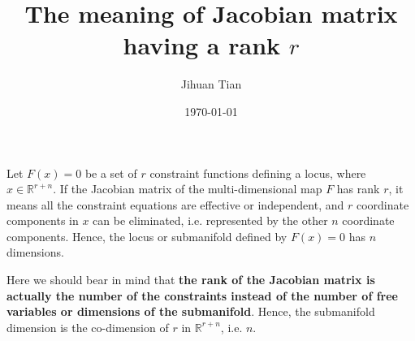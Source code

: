 \documentclass[11pt]{article}
\author{Jihuan Tian}
\date{\today}
\title{The meaning of Jacobian matrix having a rank \(r\)}
\begin{document}
\maketitle
\setcounter{tocdepth}{5}
\tableofcontents

Let \(F(x) = 0\) be a set of \(r\) constraint functions defining a locus, where \(x\in \mathbb{R}^{r+n}\). If the Jacobian matrix of the multi-dimensional map \(F\) has rank \(r\), it means all the constraint equations are effective or independent, and \(r\) coordinate components in \(x\) can be eliminated, i.e. represented by the other \(n\) coordinate components. Hence, the locus or submanifold defined by \(F(x) = 0\) has \(n\) dimensions.

Here we should bear in mind that \textbf{the rank of the Jacobian matrix is actually the number of the constraints instead of the number of free variables or dimensions of the submanifold}. Hence, the submanifold dimension is the co-dimension of \(r\) in \(\mathbb{R}^{r+n}\), i.e. \(n\).
\end{document}
